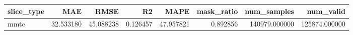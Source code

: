 \begin{tabular}{lrrrrrrr}
\toprule
slice_type & MAE & RMSE & R2 & MAPE & mask_ratio & num_samples & num_valid \\
\midrule
mmtc & 32.533180 & 45.088238 & 0.126457 & 47.957821 & 0.892856 & 140979.000000 & 125874.000000 \\
\bottomrule
\end{tabular}
